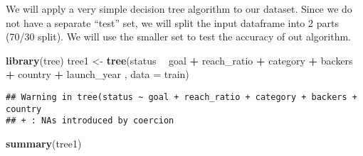 \documentclass[]{article}
\newenvironment{Shaded}{\begin{snugshade}}{\end{snugshade}}
\newcommand{\KeywordTok}[1]{\textcolor[rgb]{0.13,0.29,0.53}{\textbf{#1}}}
\newcommand{\DataTypeTok}[1]{\textcolor[rgb]{0.13,0.29,0.53}{#1}}
\newcommand{\DecValTok}[1]{\textcolor[rgb]{0.00,0.00,0.81}{#1}}
\newcommand{\FloatTok}[1]{\textcolor[rgb]{0.00,0.00,0.81}{#1}}
\newcommand{\StringTok}[1]{\textcolor[rgb]{0.31,0.60,0.02}{#1}}
\newcommand{\OperatorTok}[1]{\textcolor[rgb]{0.81,0.36,0.00}{\textbf{#1}}}
\newcommand{\NormalTok}[1]{#1}
\begin{document}
We will apply a very simple decision tree algorithm to our dataset.
Since we do not have a separate ``test'' set, we will split the input
dataframe into 2 parts (70/30 split). We will use the smaller set to
test the accuracy of out algorithm.

\begin{Shaded}
\end{Shaded}

\begin{Shaded}
\begin{Highlighting}[]
\KeywordTok{library}\NormalTok{(tree)}
\NormalTok{tree1 <-}\StringTok{ }\KeywordTok{tree}\NormalTok{(status }\OperatorTok{~}\StringTok{ }\NormalTok{goal }\OperatorTok{+}\StringTok{ }\NormalTok{reach_ratio }\OperatorTok{+}\StringTok{ }\NormalTok{category }\OperatorTok{+}\StringTok{ }\NormalTok{backers }\OperatorTok{+}\StringTok{ }\NormalTok{country }\OperatorTok{+}\StringTok{ }\NormalTok{launch_year , }\DataTypeTok{data =}\NormalTok{ train)}
\end{Highlighting}
\end{Shaded}

\begin{verbatim}
## Warning in tree(status ~ goal + reach_ratio + category + backers + country
## + : NAs introduced by coercion
\end{verbatim}

\begin{Shaded}
\begin{Highlighting}[]
\KeywordTok{summary}\NormalTok{(tree1)}
\end{Highlighting}
\end{Shaded}
\end{document}
